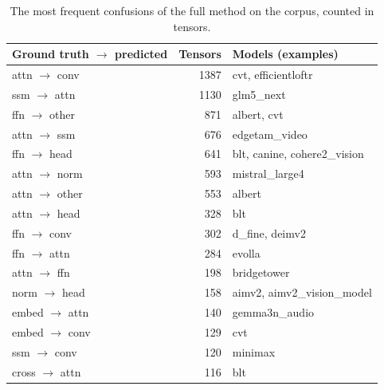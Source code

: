 \begin{table}[H]
\centering
\small
\begin{tabular}{@{}lrp{7.2cm}@{}}
\toprule
Ground truth $\to$ predicted & Tensors & Models (examples) \\
\midrule
attn $\to$ conv & 1387 & cvt, efficientloftr \\
ssm $\to$ attn & 1130 & glm5\_next \\
ffn $\to$ other & 871 & albert, cvt \\
attn $\to$ ssm & 676 & edgetam\_video \\
ffn $\to$ head & 641 & blt, canine, cohere2\_vision \\
attn $\to$ norm & 593 & mistral\_large4 \\
attn $\to$ other & 553 & albert \\
attn $\to$ head & 328 & blt \\
ffn $\to$ conv & 302 & d\_fine, deimv2 \\
ffn $\to$ attn & 284 & evolla \\
attn $\to$ ffn & 198 & bridgetower \\
norm $\to$ head & 158 & aimv2, aimv2\_vision\_model \\
embed $\to$ attn & 140 & gemma3n\_audio \\
embed $\to$ conv & 129 & cvt \\
ssm $\to$ conv & 120 & minimax \\
cross $\to$ attn & 116 & blt \\
\bottomrule
\end{tabular}
\caption{The most frequent confusions of the full method on the corpus, counted in tensors.}
\label{tab:conf}
\end{table}
